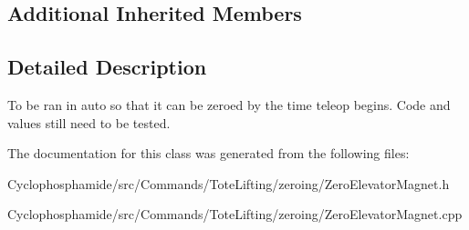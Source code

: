 \subsection*{Additional Inherited Members}


\subsection{Detailed Description}
To be ran in auto so that it can be zeroed by the time teleop begins. Code and values still need to be tested. 

The documentation for this class was generated from the following files\+:\begin{DoxyCompactItemize}
\item 
Cyclophosphamide/src/\+Commands/\+Tote\+Lifting/zeroing/Zero\+Elevator\+Magnet.\+h\item 
Cyclophosphamide/src/\+Commands/\+Tote\+Lifting/zeroing/Zero\+Elevator\+Magnet.\+cpp\end{DoxyCompactItemize}
